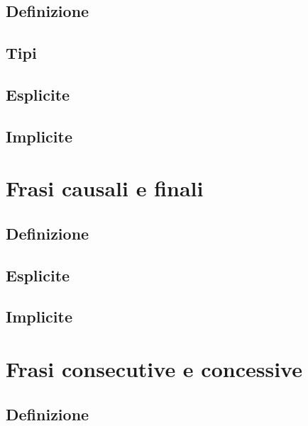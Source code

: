 \documentclass[a4paper,twoside,11pt,chapterprefix=false,bibliography=totocnumbered,listof=flat]{scrbook}
\begin{document}
\hypertarget{definizione-1}{%
\section{Definizione}\label{definizione-1}}

\hypertarget{tipi-2}{%
\section{Tipi}\label{tipi-2}}

\hypertarget{esplicite-3}{%
\section{Esplicite}\label{esplicite-3}}

\hypertarget{implicite-3}{%
\section{Implicite}\label{implicite-3}}

\hypertarget{frasi-causali-e-finali}{%
\chapter{Frasi causali e finali}\label{frasi-causali-e-finali}}

\hypertarget{definizione-2}{%
\section{Definizione}\label{definizione-2}}

\hypertarget{esplicite-4}{%
\section{Esplicite}\label{esplicite-4}}

\hypertarget{implicite-4}{%
\section{Implicite}\label{implicite-4}}

\hypertarget{frasi-consecutive-e-concessive}{%
\chapter{Frasi consecutive e
concessive}\label{frasi-consecutive-e-concessive}}

\hypertarget{definizione-3}{%
\section{Definizione}\label{definizione-3}}
\end{document}
